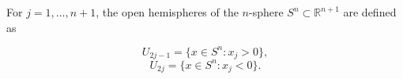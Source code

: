 For $j = 1, \ldots, n+1$, the open hemispheres of the $n$-sphere $S^n \subset \mathbb{R}^{n+1}$ are defined as

$$U_{2j-1} = \{x \in S^n : x_j > 0\},$$
$$U_{2j} = \{x \in S^n : x_j < 0\}.$$
